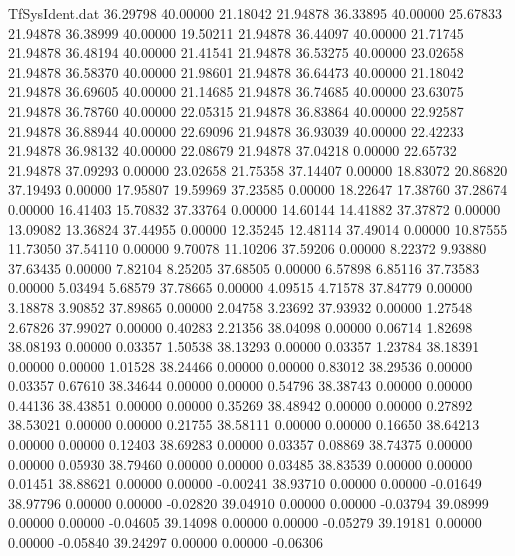 \begin{filecontents}{TfSysIdent.dat}
  36.29798   40.00000   21.18042   21.94878
  36.33895   40.00000   25.67833   21.94878
  36.38999   40.00000   19.50211   21.94878
  36.44097   40.00000   21.71745   21.94878
  36.48194   40.00000   21.41541   21.94878
  36.53275   40.00000   23.02658   21.94878
  36.58370   40.00000   21.98601   21.94878
  36.64473   40.00000   21.18042   21.94878
  36.69605   40.00000   21.14685   21.94878
  36.74685   40.00000   23.63075   21.94878
  36.78760   40.00000   22.05315   21.94878
  36.83864   40.00000   22.92587   21.94878
  36.88944   40.00000   22.69096   21.94878
  36.93039   40.00000   22.42233   21.94878
  36.98132   40.00000   22.08679   21.94878
  37.04218    0.00000   22.65732   21.94878
  37.09293    0.00000   23.02658   21.75358
  37.14407    0.00000   18.83072   20.86820
  37.19493    0.00000   17.95807   19.59969
  37.23585    0.00000   18.22647   17.38760
  37.28674    0.00000   16.41403   15.70832
  37.33764    0.00000   14.60144   14.41882
  37.37872    0.00000   13.09082   13.36824
  37.44955    0.00000   12.35245   12.48114
  37.49014    0.00000   10.87555   11.73050
  37.54110    0.00000    9.70078   11.10206
  37.59206    0.00000    8.22372    9.93880
  37.63435    0.00000    7.82104    8.25205
  37.68505    0.00000    6.57898    6.85116
  37.73583    0.00000    5.03494    5.68579
  37.78665    0.00000    4.09515    4.71578
  37.84779    0.00000    3.18878    3.90852
  37.89865    0.00000    2.04758    3.23692
  37.93932    0.00000    1.27548    2.67826
  37.99027    0.00000    0.40283    2.21356
  38.04098    0.00000    0.06714    1.82698
  38.08193    0.00000    0.03357    1.50538
  38.13293    0.00000    0.03357    1.23784
  38.18391    0.00000    0.00000    1.01528
  38.24466    0.00000    0.00000    0.83012
  38.29536    0.00000    0.03357    0.67610
  38.34644    0.00000    0.00000    0.54796
  38.38743    0.00000    0.00000    0.44136
  38.43851    0.00000    0.00000    0.35269
  38.48942    0.00000    0.00000    0.27892
  38.53021    0.00000    0.00000    0.21755
  38.58111    0.00000    0.00000    0.16650
  38.64213    0.00000    0.00000    0.12403
  38.69283    0.00000    0.03357    0.08869
  38.74375    0.00000    0.00000    0.05930
  38.79460    0.00000    0.00000    0.03485
  38.83539    0.00000    0.00000    0.01451
  38.88621    0.00000    0.00000   -0.00241
  38.93710    0.00000    0.00000   -0.01649
  38.97796    0.00000    0.00000   -0.02820
  39.04910    0.00000    0.00000   -0.03794
  39.08999    0.00000    0.00000   -0.04605
  39.14098    0.00000    0.00000   -0.05279
  39.19181    0.00000    0.00000   -0.05840
  39.24297    0.00000    0.00000   -0.06306

\end{filecontents}
